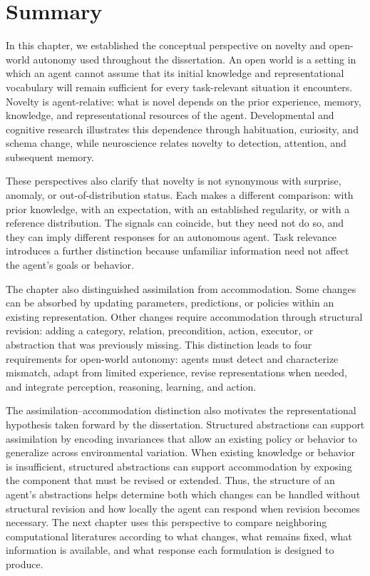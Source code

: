\section{Summary}
\label{sec:ch2_summary}

In this chapter, we established the conceptual perspective on novelty and open-world autonomy used throughout the dissertation.
An open world is a setting in which an agent cannot assume that its initial knowledge and representational vocabulary will remain sufficient for every task-relevant situation it encounters.
Novelty is agent-relative: what is novel depends on the prior experience, memory, knowledge, and representational resources of the agent.
Developmental and cognitive research illustrates this dependence through habituation, curiosity, and schema change, while neuroscience relates novelty to detection, attention, and subsequent memory.

These perspectives also clarify that novelty is not synonymous with surprise, anomaly, or out-of-distribution status.
Each makes a different comparison: with prior knowledge, with an expectation, with an established regularity, or with a reference distribution.
The signals can coincide, but they need not do so, and they can imply different responses for an autonomous agent.
Task relevance introduces a further distinction because unfamiliar information need not affect the agent's goals or behavior.

The chapter also distinguished assimilation from accommodation.
Some changes can be absorbed by updating parameters, predictions, or policies within an existing representation.
Other changes require accommodation through structural revision: adding a category, relation, precondition, action, executor, or abstraction that was previously missing.
This distinction leads to four requirements for open-world autonomy: agents must detect and characterize mismatch, adapt from limited experience, revise representations when needed, and integrate perception, reasoning, learning, and action.

The assimilation--accommodation distinction also motivates the representational hypothesis taken forward by the dissertation.
Structured abstractions can support assimilation by encoding invariances that allow an existing policy or behavior to generalize across environmental variation.
When existing knowledge or behavior is insufficient, structured abstractions can support accommodation by exposing the component that must be revised or extended.
Thus, the structure of an agent's abstractions helps determine both which changes can be handled without structural revision and how locally the agent can respond when revision becomes necessary.
The next chapter uses this perspective to compare neighboring computational literatures according to what changes, what remains fixed, what information is available, and what response each formulation is designed to produce.
